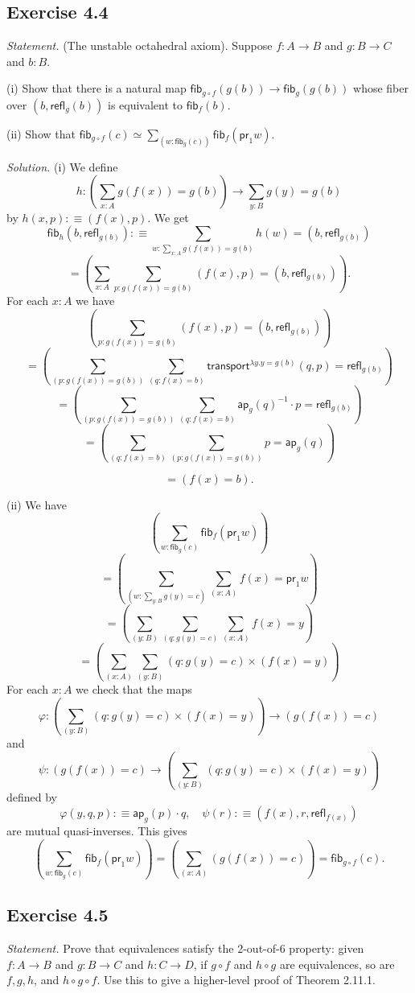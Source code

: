 \documentclass[12pt]{article}
\newcommand{\msf}{\mathsf}
\newcommand{\ap}{\mathsf{ap}}
\newcommand{\de}{:\equiv}
\newcommand{\fib}{\mathsf{fib}}
\newcommand{\nn}{\noindent}
\newcommand{\p}{\varphi}
\newcommand{\pr}{\mathsf{pr}}
\newcommand{\refl}{\mathsf{refl}}
\begin{document}

\subsection{Exercise 4.4}

\emph{Statement.} (The unstable octahedral axiom). Suppose $f:A\to B$ and $g:B\to C$ and $b:B$.

\nn(i) Show that there is a natural map $\fib_{g\circ f}(g(b))\to\fib_g(g(b))$ whose fiber over $(b, \refl_g(b) )$ is equivalent to $\fib_f(b)$.

\nn(ii) Show that $\fib_{g\circ f}(c)\simeq\sum_{(w:\fib_g(c))}\fib_f(\pr_1w)$.

\nn\emph{Solution.} (i) We define 
$$
h:\left(\sum_{x:A}g(f(x))=g(b)\right)\to\sum_{y:B}g(y)=g(b)
$$ 
by $h(x,p)\de(f(x),p)$. We get 
$$
\fib_h(b,\refl_{g(b)})\de\sum_{w:\sum_{x:A}g(f(x))=g(b)}h(w)=(b,\refl_{g(b)})
$$ 
$$
=\left(\sum_{x:A}\sum_{p:g(f(x))=g(b)}(f(x),p)=(b,\refl_{g(b)})\right).
$$ 
For each $x:A$ we have
$$
\left(\sum_{p:g(f(x))=g(b)}(f(x),p)=(b,\refl_{g(b)})\right)
$$ 
$$
=\left(\sum_{(p:g(f(x))=g(b))}\sum_{(q:f(x)=b)}\msf{transport}^{\lambda y.y=g(b)}(q,p)=\refl_{g(b)}\right)
$$ 
$$
=\left(\sum_{(p:g(f(x))=g(b))}\sum_{(q:f(x)=b)}\ap_g(q)^{-1}\cdot p=\refl_{g(b)}\right)
$$ 
$$
=\left(\sum_{(q:f(x)=b)}\sum_{(p:g(f(x))=g(b))}p=\ap_g(q)\right)
$$ 

$$
=(f(x)=b).
$$ 

\nn(ii) We have 
$$
\left(\sum_{w:\fib_g(c)}\fib_f(\pr_1w)\right)
$$ 
$$
=\left(\sum_{(w:\sum_{y:B}g(y)=c)}\sum_{(x:A)}f(x)=\pr_1w\right)
$$ 
$$
=\left(\sum_{(y:B)}\sum_{(q:g(y)=c)}\sum_{(x:A)}f(x)=y\right)
$$ 
$$
=\left(\sum_{(x:A)}\sum_{(y:B)}(q:g(y)=c)\times(f(x)=y)\right)
$$ 
For each $x:A$ we check that the maps 
$$
\p:\left(\sum_{(y:B)}(q:g(y)=c)\times(f(x)=y)\right)\to(g(f(x))=c)
$$ 
and 
$$
\psi:(g(f(x))=c)\to\left(\sum_{(y:B)}(q:g(y)=c)\times(f(x)=y)\right)
$$ 
defined by 
$$
\p(y,q,p)\de\ap_g(p)\cdot q,\quad\psi(r)\de(f(x),r,\refl_{f(x)})
$$ 
are mutual quasi-inverses. This gives 
$$
\left(\sum_{w:\fib_g(c)}\fib_f(\pr_1w)\right)=\left(\sum_{(x:A)}(g(f(x))=c)\right)=\fib_{g\circ f}(c).
$$


\subsection{Exercise 4.5}\label{45}

\emph{Statement.} Prove that equivalences satisfy the 2-out-of-6 property: given $f:A\to B$ and $g:B\to C$ and $h:C\to D$, if $g\circ f$ and $h\circ g$ are equivalences, so are $f,g,h$, and $h\circ g\circ f$. Use this to give a higher-level proof of Theorem 2.11.1.
\end{document}
